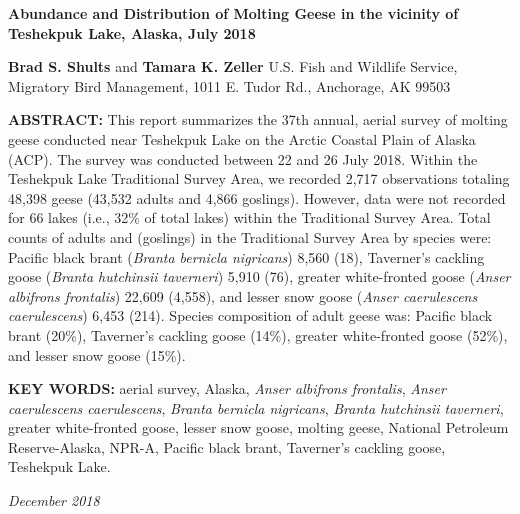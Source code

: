 \documentclass[]{article}
\title{}
\author{}
\date{}
\begin{document}
\newsavebox\mybox
\savebox{}
\newwatermark*[
  allpages,
  angle=45,
  scale=8,
  xpos=-20,
  ypos=15
]{\usebox\mybox}

\pagestyle{fancy}
\renewcommand{\footrulewidth}{1pt} \renewcommand{\headrulewidth}{0pt}

\textbf{\LARGE{Abundance and Distribution of Molting Geese in the vicinity of Teshekpuk Lake, Alaska, July 2018}}
\hfill

\large
\textbf{Brad S. Shults} and \textbf{Tamara K. Zeller}\newline
U.S. Fish and Wildlife Service, Migratory Bird Management, 1011 E. Tudor
Rd., Anchorage, AK 99503

\textbf{\large{ABSTRACT:}} This report summarizes the 37th annual,
aerial survey of molting geese conducted near Teshekpuk Lake on the
Arctic Coastal Plain of Alaska (ACP). The survey was conducted between
22 and 26 July 2018. Within the Teshekpuk Lake Traditional Survey Area,
we recorded 2,717 observations totaling 48,398 geese (43,532 adults and
4,866 goslings). However, data were not recorded for 66 lakes (i.e.,
32\% of total lakes) within the Traditional Survey Area. Total counts of
adults and (goslings) in the Traditional Survey Area by species were:
Pacific black brant (\textit{Branta bernicla nigricans}) 8,560 (18),
Taverner's cackling goose (\textit{Branta hutchinsii taverneri}) 5,910
(76), greater white-fronted goose (\textit{Anser albifrons frontalis})
22,609 (4,558), and lesser snow goose
(\textit{Anser caerulescens caerulescens}) 6,453 (214). Species
composition of adult geese was: Pacific black brant (20\%), Taverner's
cackling goose (14\%), greater white-fronted goose (52\%), and lesser
snow goose (15\%).

\textbf{KEY WORDS: }aerial survey, Alaska,
\textit{Anser albifrons frontalis},
\textit{Anser caerulescens caerulescens},
\textit{Branta bernicla nigricans},
\textit{Branta hutchinsii taverneri}, greater white-fronted goose,
lesser snow goose, molting geese, National Petroleum Reserve-Alaska,
NPR-A, Pacific black brant, Taverner's cackling goose, Teshekpuk Lake.

\hfill\textit {December 2018}
\end{document}
